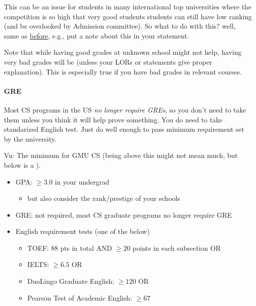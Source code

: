 \documentclass[10pt]{article}
\newcommand{\red}[1]{{\color{red}{#1}}}
\begin{document}
This can be an issue for students in many international top universities 
where the competition is so high that very good students students can still have low ranking (and be overlooked by Admission committee).
So what to do with this? well, same as \hyperref[sec:your-school]{before}, e.g., put a note about this in your statement.

Note that while having good grades at unknown school might not help,
having very bad grades will be \red{red flag} (unless your LORs or
statements give proper explanation). This is especially true if you
have bad grades in relevant courses.

\paragraph{GRE} Most CS programs in the US \emph{no longer require GREs}, so you don't need to
take them unless you think it will help prove something. You do need to
take standarized English test. Just do well enough to pass minimum
requirement set by the university.

\begin{tcolorbox}[left=1pt,right=1pt,top=1pt,bottom=1pt]
Vu: The minimum for GMU CS (being above this might not mean much, but below is a \red{red flag}).
\begin{itemize}
\item GPA: $\ge 3.0$ in your undergrad
  \begin{itemize}
  \item but also consider the rank/prestige of your schools
  \end{itemize}
\item GRE: not required, most CS graduate programs no longer require GRE
\item English requirement tests (one of the below)
  \begin{itemize}    
  \item TOEF: 88 pts in total AND $\ge 20$ points in each subsection OR
  \item IELTS: $\ge 6.5$ OR
  \item DuoLingo Graduate English: $\ge 120$ OR 
  \item Pearson Test of Academic English: $\ge 67$
  \end{itemize}  
\end{itemize}
\end{tcolorbox}
\end{document}
